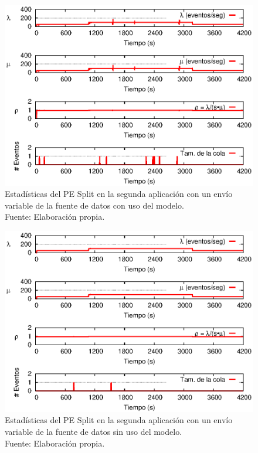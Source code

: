 \begin{figure}[!ht]
    \centering
    \captionsetup{justification=centering}
    \includegraphics[scale=1]{images/exp/app2/normal/cm/statusSplitPE.eps}
    \caption[Estadísticas del PE Split en la segunda aplicación con un envío variable de la fuente de datos con uso del modelo.]{Estadísticas del PE Split en la segunda aplicación con un envío variable de la fuente de datos con uso del modelo.\\Fuente: Elaboración propia.}
    \label{fig:app2-normal-statusSplitPE-cm}
\end{figure}

\begin{figure}[!ht]
    \centering
    \captionsetup{justification=centering}
    \includegraphics[scale=1]{images/exp/app2/normal/sm/statusSplitPE.eps}
    \caption[Estadísticas del PE Split en la segunda aplicación con un envío variable de la fuente de datos sin uso del modelo.]{Estadísticas del PE Split en la segunda aplicación con un envío variable de la fuente de datos sin uso del modelo.\\Fuente: Elaboración propia.}
    \label{fig:app2-normal-statusSplitPE-sm}
\end{figure}

